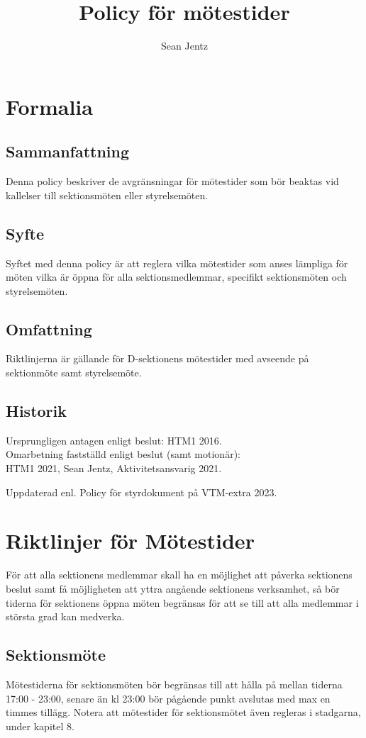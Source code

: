 \documentclass[]{dsekprotokoll}
\title{Policy för mötestider}
\author{Sean Jentz}
\begin{document}
\maketitle

\section{Formalia}

\subsection{Sammanfattning}
Denna policy beskriver de avgränsningar för mötestider som bör beaktas vid kallelser till sektionsmöten eller styrelsemöten.

\subsection{Syfte}
Syftet med denna policy är att reglera vilka mötestider som anses lämpliga för möten vilka är öppna för alla sektionsmedlemmar, specifikt sektionsmöten och styrelsemöten.

\subsection{Omfattning}
Riktlinjerna är gällande för D-sektionens mötestider med avseende på sektionmöte samt styrelsemöte.

\subsection{Historik}
Ursprungligen antagen enligt beslut: HTM1 2016. \\
Omarbetning fastställd enligt beslut (samt motionär): \\
HTM1 2021, Sean Jentz, Aktivitetsansvarig 2021.

Uppdaterad enl. Policy för styrdokument på VTM-extra 2023.

\section{Riktlinjer för Mötestider}
För att alla sektionens medlemmar skall ha en möjlighet att påverka sektionens beslut samt få möjligheten att yttra angående sektionens verksamhet, så bör tiderna för sektionens öppna möten begränsas för att se till att alla medlemmar i största grad kan medverka.

\subsection{Sektionsmöte}
Mötestiderna för sektionsmöten bör begränsas till att hålla på mellan tiderna 17:00 -
23:00, senare än kl 23:00 bör pågående punkt avslutas med max en timmes tillägg.
Notera att mötestider för sektionsmötet även regleras i stadgarna, under kapitel 8.
\end{document}
